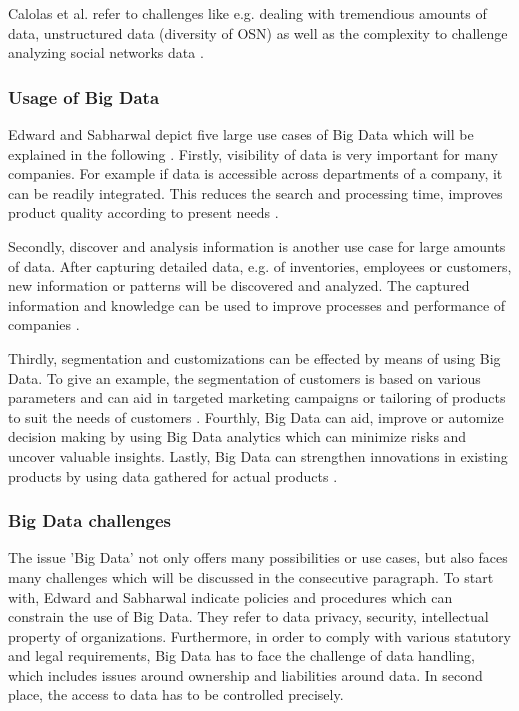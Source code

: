 Calolas et al. refer to challenges like e.g. dealing with tremendious amounts of data, unstructured data (diversity of \ac{OSN}) as well as the complexity to challenge analyzing social networks data \cites{trends_nosql}.

\subsubsection{Usage of Big Data}

Edward and Sabharwal depict five large use cases of Big Data which will be explained in the following \cite[p.9 ff.]{mongodb_edward}. Firstly, visibility of data is very important for many companies. For example if data is accessible across departments of a company, it can be readily integrated. This reduces the search and processing time, improves product quality according to present needs \cite[p.9 ff.]{mongodb_edward}. 

Secondly, discover and analysis information is another use case for large amounts of data. After capturing detailed data, e.g. of inventories, employees or customers, new information or patterns will be discovered and analyzed. The captured information and knowledge can be used to improve processes and performance of companies \cite[p.9 ff.]{mongodb_edward}. 

Thirdly, segmentation and customizations can be effected by means of using Big Data. To give an example, the segmentation of customers is based on various parameters and can aid in targeted marketing campaigns or tailoring of products to suit the needs of customers \cite[p.9 ff.]{mongodb_edward}. Fourthly, Big Data can aid, improve or automize decision making by using Big Data analytics which can minimize risks and uncover valuable insights. Lastly, Big Data can strengthen innovations in existing products by using data gathered for actual products \cite[p.9 ff.]{mongodb_edward}.    

\subsubsection{Big Data challenges}

The issue 'Big Data' not only offers many possibilities or use cases, but also faces many challenges \cite[p.11 ff.]{mongodb_edward} which will be discussed in the consecutive paragraph. To start with, Edward and Sabharwal indicate policies and procedures which can constrain the use of Big Data. They refer to data privacy, security, intellectual property of organizations. Furthermore, in order to comply with various statutory and legal requirements, Big Data has to face the challenge of data handling, which includes issues around ownership and liabilities around data. In second place, the access to data has to be controlled precisely.

